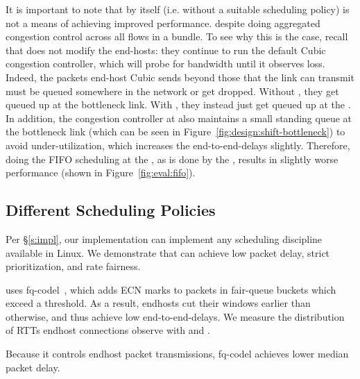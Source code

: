  It is important to note that \name by itself (i.e. without a suitable scheduling policy) is not a means of achieving improved performance. 
despite doing aggregated congestion control across all flows in a bundle.
To see why this is the case, recall that \name does not modify the end-hosts: they continue to run the default Cubic congestion controller, which will probe for bandwidth until it observes loss.
Indeed, the packets end-host Cubic sends beyond those that the link can transmit must be queued somewhere in the network or get dropped. Without \name, they get queued up at the bottleneck link. With \name, they instead just get queued up at the \inbox. In addition, the congestion controller at \inbox also maintains a small standing queue at the bottleneck link (which can be seen in Figure~\ref{fig:design:shift-bottleneck}) to avoid under-utilization, which increases the end-to-end-delays slightly. Therefore, doing the FIFO scheduling at the \name, as is done by the \baseline, results in slightly worse performance (shown in Figure~\ref{fig:eval:fifo}).



\subsection{Different Scheduling Policies}\label{s:eval:policies}
Per \S\ref{s:impl}, our \name implementation can implement any scheduling discipline available in Linux. We demonstrate that \name can achieve low packet delay, strict prioritization, and rate fairness.

\name uses fq-codel~\cite{fq-codel}, which adds ECN marks to packets in fair-queue buckets which exceed a threshold. 
As a result, endhosts cut their windows earlier than otherwise, and thus achieve low end-to-end-delays.
We measure the distribution of RTTs endhost connections observe with \name and \baseline.

Because it controls endhost packet transmissions, fq-codel achieves \delaysImprovement lower median packet delay.

